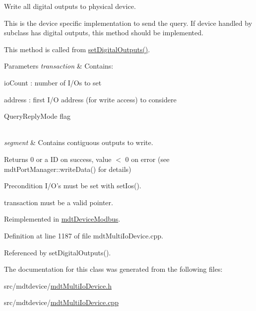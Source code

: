 Write all digital outputs to physical device. 

This is the device specific implementation to send the query. If device handled by subclass has digital outputs, this method should be implemented.

This method is called from \hyperlink{classmdt_multi_io_device_a83f6df71dc35ef002ee55b3a51a54fc9}{set\-Digital\-Outputs()}.


\begin{DoxyParams}{Parameters}
{\em transaction} & Contains\-:
\begin{DoxyItemize}
\item io\-Count \-: number of I/\-Os to set
\item address \-: first I/\-O address (for write access) to considere
\item Query\-Reply\-Mode flag 
\end{DoxyItemize}\\
\hline
{\em segment} & Contains contiguous outputs to write. \\
\hline
\end{DoxyParams}
\begin{DoxyReturn}{Returns}
0 or a I\-D on success, value $<$ 0 on error (see mdt\-Port\-Manager\-::write\-Data() for details) 
\end{DoxyReturn}
\begin{DoxyPrecond}{Precondition}
I/\-O's must be set with set\-Ios(). 

transaction must be a valid pointer. 
\end{DoxyPrecond}


Reimplemented in \hyperlink{classmdt_device_modbus_a6713edaee0bfba48791008124299b753}{mdt\-Device\-Modbus}.



Definition at line 1187 of file mdt\-Multi\-Io\-Device.\-cpp.



Referenced by set\-Digital\-Outputs().



The documentation for this class was generated from the following files\-:\begin{DoxyCompactItemize}
\item 
src/mdtdevice/\hyperlink{mdt_multi_io_device_8h}{mdt\-Multi\-Io\-Device.\-h}\item 
src/mdtdevice/\hyperlink{mdt_multi_io_device_8cpp}{mdt\-Multi\-Io\-Device.\-cpp}\end{DoxyCompactItemize}
